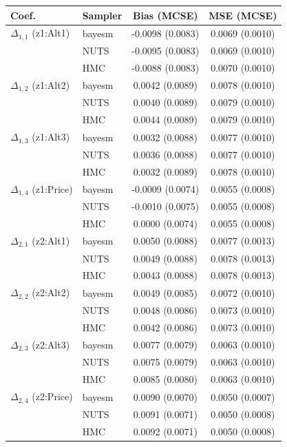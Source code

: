 \begin{tabular}{llcc}
\toprule
Coef. & Sampler & Bias (MCSE) & MSE (MCSE) \\
\midrule
$\Delta_{1,1}$ (z1:Alt1) & bayesm & -0.0098 (0.0083) & 0.0069 (0.0010) \\
 & NUTS & -0.0095 (0.0083) & 0.0069 (0.0010) \\
 & HMC & -0.0088 (0.0083) & 0.0070 (0.0010) \\
$\Delta_{1,2}$ (z1:Alt2) & bayesm & 0.0042 (0.0089) & 0.0078 (0.0010) \\
 & NUTS & 0.0040 (0.0089) & 0.0079 (0.0010) \\
 & HMC & 0.0044 (0.0089) & 0.0079 (0.0010) \\
$\Delta_{1,3}$ (z1:Alt3) & bayesm & 0.0032 (0.0088) & 0.0077 (0.0010) \\
 & NUTS & 0.0036 (0.0088) & 0.0077 (0.0010) \\
 & HMC & 0.0032 (0.0089) & 0.0078 (0.0010) \\
$\Delta_{1,4}$ (z1:Price) & bayesm & -0.0009 (0.0074) & 0.0055 (0.0008) \\
 & NUTS & -0.0010 (0.0075) & 0.0055 (0.0008) \\
 & HMC & 0.0000 (0.0074) & 0.0055 (0.0008) \\
$\Delta_{2,1}$ (z2:Alt1) & bayesm & 0.0050 (0.0088) & 0.0077 (0.0013) \\
 & NUTS & 0.0049 (0.0088) & 0.0078 (0.0013) \\
 & HMC & 0.0043 (0.0088) & 0.0078 (0.0013) \\
$\Delta_{2,2}$ (z2:Alt2) & bayesm & 0.0049 (0.0085) & 0.0072 (0.0010) \\
 & NUTS & 0.0048 (0.0086) & 0.0073 (0.0010) \\
 & HMC & 0.0042 (0.0086) & 0.0073 (0.0010) \\
$\Delta_{2,3}$ (z2:Alt3) & bayesm & 0.0077 (0.0079) & 0.0063 (0.0010) \\
 & NUTS & 0.0075 (0.0079) & 0.0063 (0.0010) \\
 & HMC & 0.0085 (0.0080) & 0.0063 (0.0010) \\
$\Delta_{2,4}$ (z2:Price) & bayesm & 0.0090 (0.0070) & 0.0050 (0.0007) \\
 & NUTS & 0.0091 (0.0071) & 0.0050 (0.0008) \\
 & HMC & 0.0092 (0.0071) & 0.0050 (0.0008) \\
\bottomrule
\end{tabular}
